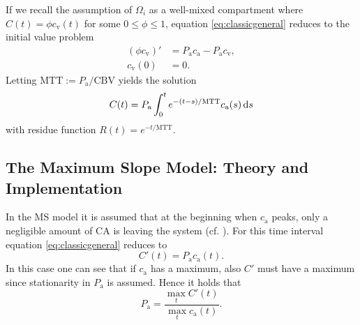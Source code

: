 \documentclass[paper=a4, fontsize=11pt,parskip=half,headings=small]{scrartcl}
\newcommand{\ca}{c_\mathrm{a}}
\newcommand{\CBV}{\mathrm{CBV}}
\newcommand{\MTT}{\mathrm{MTT}}
\newcommand{\cout}{c_{\mathrm{v}}}
\newcommand{\Pa}{P_{\mathrm{a}}}
\begin{document}
	If we recall the assumption of $\Omega_i$ as a well-mixed compartment where $C(t) = \phi\cout(t)$ for some $0 \le \phi \le 1$, equation \eqref{eq:classicgeneral} reduces to the initial value problem
	\begin{align*}
		(\phi \cout)' &= \Pa \ca - \Pa \cout, \\
		\cout(0)&=0.
	\end{align*}
	Letting $\MTT:=\Pa/\CBV$ yields the solution
	\begin{equation}
		C(t) = \Pa \int_0^t e^{-(t-s)/\MTT}\ca(s)\diffint s
	\end{equation}
	with residue function $R(t)=e^{-t/\MTT}$. 

	
	
	
	\subsection{The Maximum Slope Model: Theory and Implementation}\label{sec:ms}	
	In the MS model it is assumed that at the beginning when $\ca$ peaks, only a negligible amount of CA is leaving the system (cf. \cite{klotz99}).
	For this time interval equation \eqref{eq:classicgeneral} reduces to 
	\begin{equation}
		C'(t) = \Pa\ca(t).
	\end{equation}
	In this case one can see that if $\ca$ has a maximum, also $C'$ must have a maximum since stationarity in $\Pa$ is assumed.
	Hence it holds that
	\begin{equation}\label{eq:MS}
		\Pa = \frac{\max_{t}C'(t)}{\max_{t}\ca(t)}.
	\end{equation}
	
	
	
\end{document}
